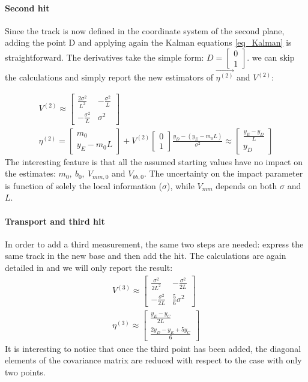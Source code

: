 \documentclass[12pt,a4paper,openright, oneside, titlepage]{book} %
\begin{document}
\paragraph{Second hit} 
Since the track is now defined in the coordinate system of the second plane, 
adding the point D and applying again the Kalman equations \ref{eq_Kalman} is straightforward. 
The derivatives take the simple form: $D=\begin{bmatrix}0\\1\end{bmatrix}$. 
we can skip the calculations and simply report the new estimators  of $\vec{\eta^{(2)}}$ and  $V^{(2)}$:

\begin{equation}
\begin{gathered}
V^{(2)}\approx
\begin{bmatrix}
\frac{2\sigma^2}{L^2} & -\frac{\sigma^2}{L} \\
-\frac{\sigma^2}{L} & \sigma^2
\end{bmatrix}\\
\eta^{(2)} = 
\begin{bmatrix} m_0 \\  y_E-m_0L \end{bmatrix} +
V^{(2)}
\begin{bmatrix} 0\\1 \end{bmatrix}
\frac{y_D-(y_E-m_0L)}{\sigma^2} \approx
\begin{bmatrix} \frac{y_E-y_D}{L} \\ y_D\end{bmatrix}
\end{gathered}
\label{eq_V2}
\end{equation}
The interesting feature is that all the assumed starting values have no impact on the estimates: $m_0,\ b_0,\ V_{mm,0}$ and $V_{bb,0}$. 
The uncertainty on the impact parameter is function of solely the local information ($\sigma$), 
while $V_{mm}$ depends on both $\sigma$ and $L$. 

\paragraph{Transport and third hit} 
In order to add a third measurement, 
the same two steps are needed: 
express the same track in the new base and then add the hit. 
The calculations are again detailed in \cite{KutschkePaper} and we will only report the result:
\begin{gather*}
V^{(3)}\approx
\begin{bmatrix}
\frac{\sigma^2}{2L^2} & -\frac{\sigma^2}{2L} \\
-\frac{\sigma^2}{2L} & \frac{5}{6}\sigma^2
\end{bmatrix}\\
\eta^{(3)} \approx
\begin{bmatrix} \frac{y_E-y_C}{2L} \\ \frac{2y_D-y_E+5y_C}{6}
\end{bmatrix}
\end{gather*}
It is interesting to notice that once the third point has been added, 
the diagonal elements of the covariance matrix are reduced with respect to the case with only two points. 
\end{document}
